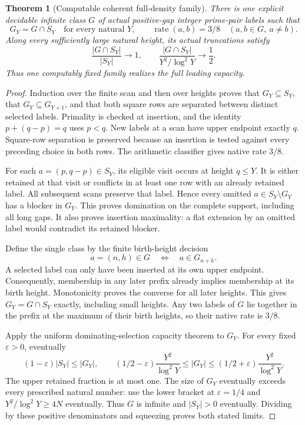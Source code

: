 \documentclass[11pt]{article}
\newtheorem{theorem}{Theorem}[section]
\begin{document}
\begin{theorem}[Computable coherent full-density family]
There is one explicit decidable infinite class \(G\) of actual
positive-gap integer prime-pair labels such that
\[
 G_Y=G\cap S_Y\quad\text{for every natural }Y,
 \qquad
 \operatorname{rate}(a,b)=3/8
 \quad(a,b\in G,\ a\ne b).
\]
Along every sufficiently large natural height, its actual truncations satisfy
\[
 \frac{|G\cap S_Y|}{|S_Y|}\longrightarrow1,\qquad
 \frac{|G\cap S_Y|}{Y^2/\log^2Y}\longrightarrow\frac12.
\]
Thus one computably fixed family realizes the full leading capacity.
\end{theorem}
\begin{proof}
Induction over the finite scan and then over heights proves that
\(G_Y\subseteq S_Y\), that \(G_Y\subseteq G_{Y+1}\), and that both square
rows are separated between distinct selected labels. Primality is checked
at insertion, and the identity \(p+(q-p)=q\) uses \(p<q\). New labels
at a scan have upper endpoint exactly \(q\). Square-row separation is
preserved because an insertion is tested against every preceding choice
in both rows. The arithmetic classifier gives native rate \(3/8\).

For each \(a=(p,q-p)\in S_Y\), its eligible visit occurs at height \(q\le Y\).
It is either retained at that visit or conflicts in at least one row
with an already retained label. All subsequent scans preserve that label.
Hence every omitted \(a\in S_Y\setminus G_Y\) has a blocker in \(G_Y\).
This proves domination on the complete support, including all long gaps.
It also proves insertion maximality: a flat extension by an omitted
label would contradict its retained blocker.

Define the single class by the finite birth-height decision
\[
 a=(n,h)\in G
 \quad\Longleftrightarrow\quad
 a\in G_{n+h}.
\]
A selected label can only have been inserted at its own upper endpoint.
Consequently, membership in any later prefix already implies membership
at its birth height. Monotonicity proves the converse for all later
heights. This gives \(G_Y=G\cap S_Y\) exactly, including small heights.
Any two labels of \(G\) lie together in the prefix at the maximum of their
birth heights, so their native rate is \(3/8\).

Apply the uniform dominating-selection capacity theorem to \(G_Y\).
For every fixed \(\varepsilon>0\), eventually
\[
 (1-\varepsilon)|S_Y|\le |G_Y|,\qquad
 (1/2-\varepsilon)\frac{Y^2}{\log^2Y}
 \le |G_Y|
 \le(1/2+\varepsilon)\frac{Y^2}{\log^2Y}.
\]
The upper retained fraction is at most one. The size of \(G_Y\)
eventually exceeds every prescribed natural number: use the lower
bracket at \(\varepsilon=1/4\) and
\(Y^2/\log^2Y\ge4N\) eventually. Thus \(G\) is infinite and
\(|S_Y|>0\) eventually. Dividing by these positive denominators and
squeezing proves both stated limits.
\end{proof}
\end{document}

